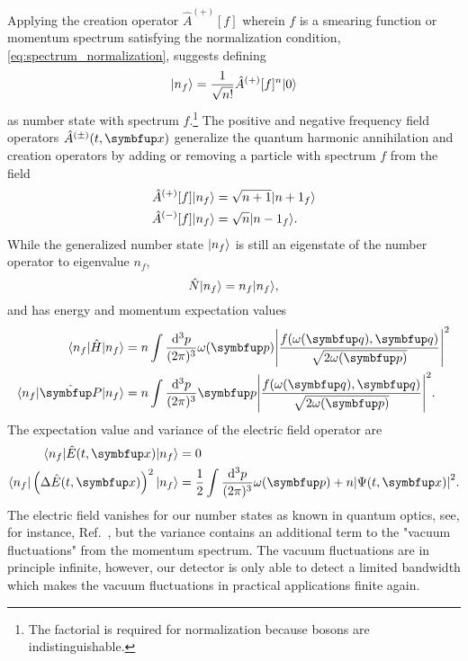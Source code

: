 Applying the creation operator $\hat{A}^{(+)}[f]$ wherein $f$ is a smearing function or momentum spectrum satisfying the normalization condition, \cref{eq:spectrum_normalization}, suggests defining
\begin{equation}
	\ket{n_f}
	=
	\frac{1}{\sqrt{n!}}
	\hat{A}^{(+)}[f]^n
	\vacket
	\label{eq:number_state}
\end{equation}
as number state with spectrum $f$.\footnote{The factorial is required for normalization because bosons are indistinguishable.}
The positive and negative frequency field operators $\hat{A}^{(\pm)}(t,\vb{x})$ generalize the quantum harmonic annihilation and creation operators by adding or removing a particle with spectrum $f$ from the field
\begin{align}
	\hat{A}^{(+)}[f]
	\lvert n_f\rangle
	&=
	\sqrt{n+1}
	\lvert{n+1}_f\rangle
	\\
	\hat{A}^{(-)}[f]
	\lvert n_f\rangle
	&=
	\sqrt{n}
	\lvert{n-1}_f\rangle
	.
\end{align}
While the generalized number state $\lvert n_f\rangle$ is still an eigenstate of the number operator to eigenvalue $n_f$,
\begin{equation}
	\hat{N}
	\lvert n_f\rangle
	=
	n_f
	\lvert n_f\rangle
	,
\end{equation}
and has energy and momentum expectation values
\begin{align}
	\bra{n_f}
	\hat{H}
	\ket{n_f}
	&=
	n
	\int\frac{\dd[3]{p}}{(2\pi)^3}
	\omega(\vb{p})
	\abs*{\frac{f\!\left(\omega(\vb{q}),\vb{q}\right)}{\sqrt{2\omega(\vb{p})}}}^2
	\\
	\bra{n_f}
	\vu{P}
	\ket{n_f}
	&=
	n
	\int\frac{\dd[3]{p}}{(2\pi)^3}
	\vb{p}
	\abs*{\frac{f\!\left(\omega(\vb{q}),\vb{q}\right)}{\sqrt{2\omega(\vb{p})}}}^2
	.
\end{align}
The expectation value and variance of the electric field operator are
\begin{align}
	\bra{n_f}
	\hat{E}(t,\vb{x})
	\ket{n_f}
	&=
	0
	\\
	\bra{n_f}
	\left(
		\Delta
		\hat{E}(t,\vb{x})
	\right)^2
	\ket{n_f}
	&=
	\frac{1}{2}
	\int\frac{\dd[3]{p}}{(2\pi)^3}
	\omega(\vb{p})
	+
	n
	\abs*{\Psi(t,\vb{x})}^2
	.
\end{align}
The electric field vanishes for our number states as known in quantum optics, see, for instance, Ref.~\cite{Gerry2005}, but the variance contains an additional term to the "vacuum fluctuations" from the momentum spectrum.
The vacuum fluctuations are in principle infinite, however, our detector is only able to detect a limited bandwidth which makes the vacuum fluctuations in practical applications finite again.

